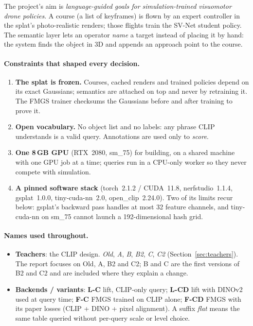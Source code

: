 \documentclass[11pt,a4paper]{article}
\begin{document}
The project's aim is \emph{language-guided goals for simulation-trained visuomotor drone policies}. A course (a list of
keyframes) is flown by an expert controller in the splat's photo-realistic renders; those flights train the SV-Net
student policy. The semantic layer lets an operator \emph{name} a target instead of placing it by hand: the system
finds the object in 3D and appends an approach point to the course.

\paragraph{Constraints that shaped every decision.}
\begin{enumerate}
  \item \textbf{The splat is frozen.} Courses, cached renders and trained policies depend on its exact Gaussians;
        semantics are attached on top and never by retraining it. The FMGS trainer checksums the Gaussians before and
        after training to prove it.
  \item \textbf{Open vocabulary.} No object list and no labels: any phrase CLIP understands is a valid query.
        Annotations are used only to \emph{score}.
  \item \textbf{One 8\,GB GPU} (RTX~2080, sm\_75) for building, on a shared machine with one GPU job at a time; queries
        run in a CPU-only worker so they never compete with simulation.
  \item \textbf{A pinned software stack} (torch~2.1.2 / CUDA~11.8, nerfstudio~1.1.4, gsplat~1.0.0, tiny-cuda-nn~2.0,
        open\_clip~2.24.0). Two of its limits recur below: gsplat's backward pass handles at most 32 feature channels,
        and tiny-cuda-nn on sm\_75 cannot launch a 192-dimensional hash grid.
\end{enumerate}

\paragraph{Names used throughout.}
\begin{itemize}
  \item \textbf{Teachers}: the CLIP design. \emph{Old}, \emph{A}, \emph{B}, \emph{B2}, \emph{C}, \emph{C2}
        (Section~\ref{sec:teachers}). The report focuses on Old, A, B2 and C2; B and C are the first versions of B2 and C2
        and are included where they explain a change.
  \item \textbf{Backends / variants}: \textbf{L-C} lift, CLIP-only query; \textbf{L-CD} lift with DINOv2 used at query
        time; \textbf{F-C} FMGS trained on CLIP alone; \textbf{F-CD} FMGS with its paper losses (CLIP + DINO + pixel
        alignment). A suffix \emph{flat} means the same table queried without per-query scale or level choice.
\end{itemize}
\end{document}
